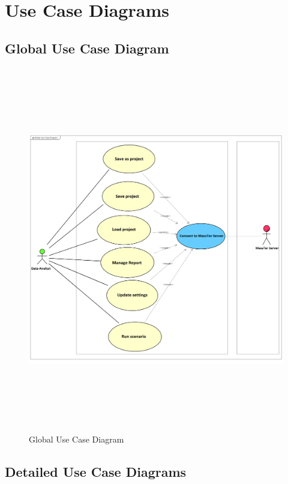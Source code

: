 	\section{Use Case Diagrams}
	\subsection{Global Use Case Diagram}
	\begin{figure}[h]
		\centering
		\includegraphics[width=16.5cm,height=16cm]{GlobalUseCaseDiagram.png}
		\caption{Global Use Case Diagram}
		
	\end{figure}

\clearpage
\newpage

	\subsection{Detailed Use Case Diagrams}
